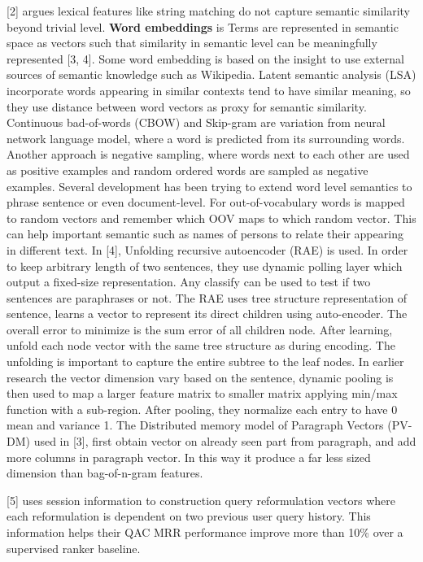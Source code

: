 \documentclass[12pt]{article} %
\begin{document}
[2] argues lexical features like string matching do not capture semantic similarity beyond trivial level. \textbf{Word embeddings} is Terms are represented in semantic space as vectors such that similarity in semantic level can be meaningfully represented [3, 4]. 
Some word embedding is based on the insight to use external sources of semantic knowledge such as Wikipedia.
Latent semantic analysis (LSA) incorporate words appearing in similar contexts tend to have similar meaning, so they use distance between word vectors as proxy for semantic similarity. Continuous bad-of-words (CBOW) and Skip-gram are variation from neural network language model, where a word is predicted from its surrounding words. Another approach is negative sampling, where words next to each other are used as positive examples and random ordered words are sampled as negative examples.
Several development has been trying to extend word level semantics to phrase sentence or even document-level.
For out-of-vocabulary words is mapped to random vectors and remember which OOV maps to which random vector. This can help important semantic such as names of persons to relate their appearing in different text.
In [4], Unfolding recursive autoencoder (RAE) is used. In order to keep arbitrary length of two sentences, they use dynamic polling layer which output a fixed-size representation. Any classify can be used to test if two sentences are paraphrases or not. The RAE uses tree structure representation of sentence, learns a vector to represent its direct children using auto-encoder. The overall error to minimize is the sum error of all children node. After learning, unfold each node vector with the same tree structure as during encoding. The unfolding is important to capture the entire subtree to the leaf nodes.
In earlier research the vector dimension vary based on the sentence, dynamic pooling is then used to map a larger feature matrix to smaller matrix applying min/max function with a sub-region. After pooling, they normalize each entry to have 0 mean and variance 1.
The Distributed memory model of Paragraph Vectors (PV-DM) used in [3], first obtain vector on already seen part from paragraph, and add more columns in paragraph vector. In this way it produce a far less sized dimension than bag-of-n-gram features.

[5] uses session information to construction query reformulation vectors where each reformulation is dependent on two previous user query history. This information helps their QAC MRR performance improve more than 10\% over a supervised ranker baseline.
\end{document}
